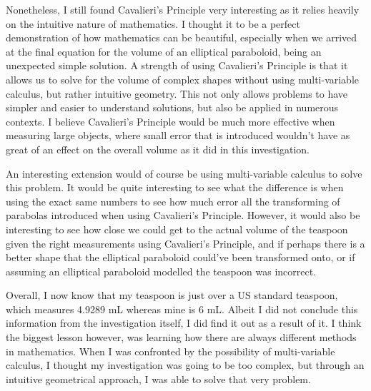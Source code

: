\documentclass[12pt]{article}
\begin{document}
Nonetheless, I still found Cavalieri's Principle very interesting as it relies heavily on the intuitive nature of mathematics. I thought it to be a perfect demonstration of how mathematics can be beautiful, especially when we arrived at the final equation for the volume of an elliptical paraboloid, being an unexpected simple solution. A strength of using Cavalieri's Principle is that it allows us to solve for the volume of complex shapes without using multi-variable calculus, but rather intuitive geometry. This not only allows problems to have simpler and easier to understand solutions, but also be applied in numerous contexts. I believe Cavalieri's Principle would be much more effective when measuring large objects, where small error that is introduced wouldn't have as great of an effect on the overall volume as it did in this investigation.

An interesting extension would of course be using multi-variable calculus to solve this problem. It would be quite interesting to see what the difference is when using the exact same numbers to see how much error all the transforming of parabolas introduced when using Cavalieri's Principle. However, it would also be interesting to see how close we could get to the actual volume of the teaspoon given the right measurements using Cavalieri's Principle, and if perhaps there is a better shape that the elliptical paraboloid could've been transformed onto, or if assuming an elliptical paraboloid modelled the teaspoon was incorrect.

Overall, I now know that my teaspoon is just over a US standard teaspoon, which measures 4.9289 mL whereas mine is 6 mL. Albeit I did not conclude this information from the investigation itself, I did find it out as a result of it. I think the biggest lesson however, was learning how there are always different methods in mathematics. When I was confronted by the possibility of multi-variable calculus, I thought my investigation was going to be too complex, but through an intuitive geometrical approach, I was able to solve that very problem.



\pagebreak

\printbibliography
\end{document}
